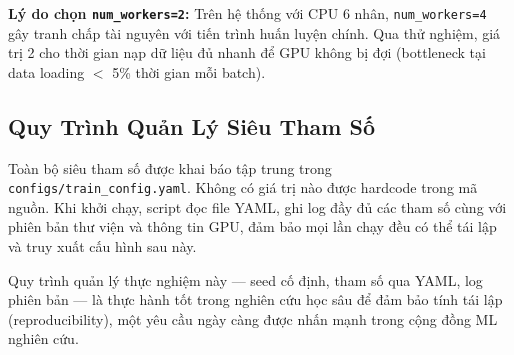 \textbf{Lý do chọn \texttt{num\_workers=2}:} Trên hệ thống với CPU 6 nhân, \texttt{num\_workers=4} gây tranh chấp tài nguyên với tiến trình huấn luyện chính. Qua thử nghiệm, giá trị 2 cho thời gian nạp dữ liệu đủ nhanh để GPU không bị đợi (bottleneck tại data loading $<$ 5\% thời gian mỗi batch).

\subsection{Quy Trình Quản Lý Siêu Tham Số}

Toàn bộ siêu tham số được khai báo tập trung trong \texttt{configs/train\_config.yaml}. Không có giá trị nào được hardcode trong mã nguồn. Khi khởi chạy, script đọc file YAML, ghi log đầy đủ các tham số cùng với phiên bản thư viện và thông tin GPU, đảm bảo mọi lần chạy đều có thể tái lập và truy xuất cấu hình sau này.

Quy trình quản lý thực nghiệm này --- seed cố định, tham số qua YAML, log phiên bản --- là thực hành tốt trong nghiên cứu học sâu để đảm bảo tính tái lập (reproducibility), một yêu cầu ngày càng được nhấn mạnh trong cộng đồng ML nghiên cứu.
